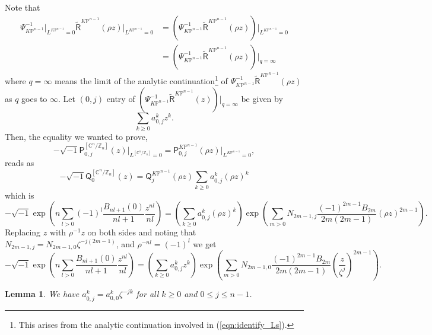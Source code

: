 \documentclass[12pt]{amsart}
\newtheorem{lem}[prop]{Lemma}
\numberwithin{equation}{section}
\newcommand{\CnZn}{[\mathbb{C}^n/\mathbb{Z}_n]}
\newcommand{\KP}{K\mathbb{P}}
\begin{document}
Note that
\begin{equation*}
\begin{split}
\Psi^{-1}_{\KP^{n-1}}\big\vert_{L^{\KP^{n-1}}=0}\widetilde{\mathsf{R}}^{\KP^{n-1}}({\rho}z)\big\vert_{L^{\KP^{n-1}}=0}
&=\left(\Psi^{-1}_{\KP^{n-1}}\widetilde{\mathsf{R}}^{\KP^{n-1}}({\rho}z)\right)\big\vert_{L^{\KP^{n-1}}=0}\\
&=\left(\Psi^{-1}_{\KP^{n-1}}\widetilde{\mathsf{R}}^{\KP^{n-1}}({\rho}z)\right)\big\vert_{q=\infty}
\end{split}
\end{equation*}
where $q=\infty$ means the limit of the analytic continuation\footnote{This arises from the analytic continuation involved in (\ref{eqn:identify_Ls}).} of $\Psi^{-1}_{\KP^{n-1}}\widetilde{\mathsf{R}}^{\KP^{n-1}}({\rho}z)$ as $q$ goes to $\infty$. Let $(0,j)$ entry of $\left(\Psi^{-1}_{\KP^{n-1}}\widetilde{\mathsf{R}}^{\KP^{n-1}}(z)\right)\big\vert_{q=\infty}$ be given by
\begin{equation}\label{eqn:const_at_infty}
\sum_{k\geq{0}}a_{0,j}^kz^k.
\end{equation}
Then, the equality we wanted to prove, 
\begin{equation*}
-\sqrt{-1}\mathsf{P}_{0,j}^{\CnZn}(z)\big\vert_{L^{\CnZn}=0}=\mathsf{P}_{0,j}^{\KP^{n-1}}({\rho}z)\big\vert_{L^{\KP^{n-1}}=0},    
\end{equation*}
reads as
\begin{equation*}
-\sqrt{-1}\mathsf{Q}_0^{\CnZn}(z)=\mathsf{Q}_j^{\KP^{n-1}}({\rho}z)\sum_{k\geq{0}}a_{0,j}^k({\rho}z)^k
\end{equation*}
which is
\begin{equation*}
-\sqrt{-1}\exp\left(n\sum_{l>0}(-1)^{l}\frac{B_{nl+1}\left(0\right)}{nl+1}\frac{z^{nl}}{nl} \right)
=\left(\sum_{k\geq{0}}a_{0,j}^k({\rho}z)^k\right)\exp\left(\sum_{m>0}N_{2m-1, j}\frac{(-1)^{2m-1}B_{2m}}{2m(2m-1)}({\rho}z)^{2m-1}\right).
\end{equation*}
Replacing $z$ with $\rho^{-1}z$ on both sides and noting that $N_{2m-1, j}=N_{2m-1, 0}\zeta^{-j(2m-1)}$, and $\rho^{-nl}=(-1)^l$ we get
\begin{equation*}
-\sqrt{-1}\exp\left(n\sum_{l>0}\frac{B_{nl+1}\left(0\right)}{nl+1}\frac{z^{nl}}{nl} \right)
=\left(\sum_{k\geq{0}}a_{0,j}^kz^k\right)\exp\left(\sum_{m>0}N_{2m-1, 0}\frac{(-1)^{2m-1}B_{2m}}{2m(2m-1)}\left(\frac{z}{\zeta^j}\right)^{2m-1}\right).
\end{equation*}

\begin{lem}
We have $a_{0,j}^k=a_{0,0}^k\zeta^{-jk}$ for all $k\geq{0}$ and $0\leq{j}\leq{n-1}$.
\end{lem}
\end{document}
